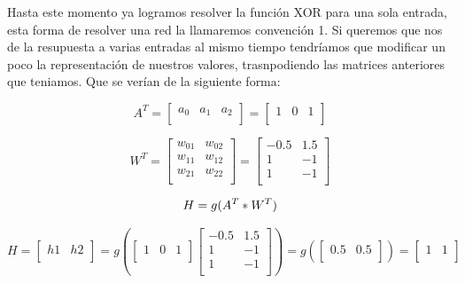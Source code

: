  
Hasta este momento ya logramos resolver la función XOR para una sola entrada, esta forma de resolver una red la llamaremos convención 1.
Si queremos que nos de la resupuesta a varias entradas al mismo tiempo tendríamos que modificar un poco la representación de nuestros valores, trasnpodiendo las matrices anteriores que teniamos. Que se verían de la siguiente forma:

 $$
 A^ {T} =
 \begin{bmatrix}
  a_{0} & a_{1} & a_{2}\\
 \end{bmatrix}
 =
 \begin{bmatrix}
  1 & 0 & 1 \\
 \end{bmatrix}
 $$

 $$
 W^ {T}  =
 \begin{bmatrix}
  w_{01} & w_{02}\\
  w_{11} & w_{12}\\
  w_{21} & w_{22}\\
 \end{bmatrix}
 =
 \begin{bmatrix}
  -0.5 & 1.5\\
  1 & -1\\
  1 & -1\\
 \end{bmatrix}
 $$

 $$
 H = g(A^{T}*W^{T}) \\
 $$

  $$
 H=
 \begin{bmatrix}
  h{1} & h{2}\\
 \end{bmatrix}
 = g \left(
 \begin{bmatrix}
  1 & 0 & 1\\
 \end{bmatrix}
 \begin{bmatrix}
  -0.5 & 1.5\\
  1 & -1\\
  1 & -1\\
 \end{bmatrix}
 \right) = g \left(
 \begin{bmatrix}
  0.5 &  0.5 \\
 \end{bmatrix}
\right) =
 \begin{bmatrix}
  1 &  1 \\
 \end{bmatrix}
$$


